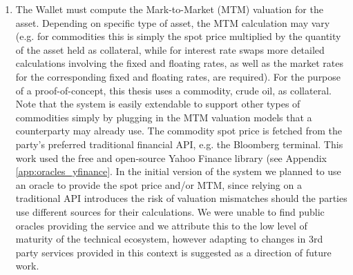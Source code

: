 \begin{enumerate}
    \begin{enumerate}
    
        \item \label{item:legal_econ_terms} The Wallet must compute the Mark-to-Market (MTM) valuation for the asset. Depending on specific type of asset, the MTM calculation may vary (e.g. for commodities this is simply the spot price multiplied by the quantity of the asset held as collateral, while for interest rate swaps more detailed calculations involving the fixed and floating rates, as well as the market rates for the corresponding fixed and floating rates, are required). For the purpose of a proof-of-concept, this thesis uses a commodity, crude oil, as collateral. Note that the system is easily extendable to support other types of commodities simply by plugging in the MTM valuation models that a counterparty may already use. The commodity spot price is fetched from the party's preferred traditional financial API, e.g. the Bloomberg terminal. This work used the free and open-source Yahoo Finance library \citep{yfinance, yfinance_python} (see Appendix \ref{app:oracles_yfinance}. In the initial version of the system we planned to use an oracle to provide the spot price and/or MTM, since relying on a traditional API introduces the risk of valuation mismatches should the parties use different sources for their calculations. We were unable to find public oracles providing the service and we attribute this to the low level of maturity of the technical ecosystem, however adapting to changes in 3rd party services provided in this context is suggested as a direction of future work.


\end{enumerate}
\end{enumerate}
